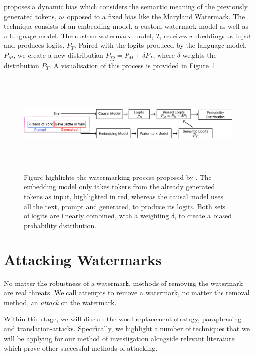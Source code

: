 \documentclass{l4proj}
\theoremstyle{definition}
\begin{document}
        \citet{liu2024semantic} proposes a dynamic bias which considers the semantic meaning of the previously generated tokens, as opposed to a fixed bias like the \hyperref[sec:maryland-watermark]{Maryland Watermark}. The technique consists of an embedding model, a custom watermark model as well as a language model. The custom watermark model, $T$, receives embeddings as input and produces logits, $P_T$. Paired with the logits produced by the language model, $P_M$, we create a new distribution $P_{\hat{M}} = P_M + \delta P_T$, where $\delta$ weights the distribution $P_T$. A visualisation of this process is provided in Figure~\ref{fig:embedding-watermark-process}

        \begin{figure}[ht]
            \centering
            \includegraphics[height=5cm, width=\linewidth, keepaspectratio]{images/background/embedding-watermark-process.pdf}
            \caption{Figure highlights the watermarking process proposed by \citet{liu2024semantic}. The embedding model only takes tokens from the already generated tokens as input, highlighted in red, whereas the causal model uses all the text, prompt and generated, to produce its logits. Both sets of logits are linearly combined, with a weighting $\delta$, to create a biased probability distribution.}            \label{fig:embedding-watermark-process}
        \end{figure}
        
\section{Attacking Watermarks}
        No matter the robustness of a watermark, methods of removing the watermark are real threats. We call attempts to remove a watermark, no matter the removal method, an \emph{attack} on the watermark.

        Within this stage, we will discuss the word-replacement strategy, paraphrasing and translation-attacks. Specifically, we highlight a number of techniques that we will be applying for our method of investigation alongside relevant literature which prove other successful methods of attacking.
\end{document}
